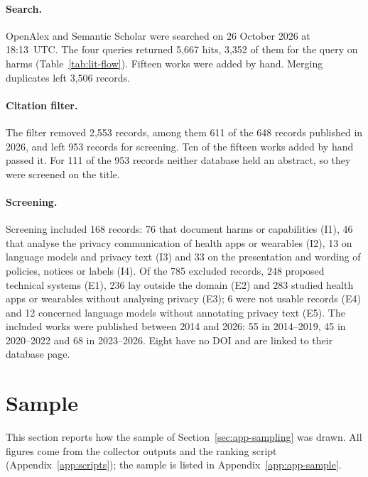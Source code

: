 \documentclass[twoside,its]{bossthesis}
\begin{document}
\paragraph{Search.} OpenAlex and Semantic Scholar were searched on 26 October
2026 at 18:13~UTC\@. The four queries returned 5{,}667 hits, 3{,}352 of them for
the query on harms (Table~\ref{tab:lit-flow}). Fifteen works were added by
hand. Merging duplicates left 3{,}506 records.

\paragraph{Citation filter.} The filter removed 2{,}553 records, among them 611
of the 648 records published in 2026, and left 953 records for screening. Ten
of the fifteen works added by hand passed it. For 111 of the 953 records
neither database held an abstract, so they were screened on the title.

\paragraph{Screening.} Screening included 168 records: 76 that document harms
or capabilities (I1), 46 that analyse the privacy communication of health apps
or wearables (I2), 13 on language models and privacy text (I3) and 33 on the
presentation and wording of policies, notices or labels (I4). Of the 785
excluded records, 248 proposed technical systems (E1), 236 lay outside the
domain (E2) and 283 studied health apps or wearables without analysing privacy
(E3); 6 were not usable records (E4) and 12 concerned language models without
annotating privacy text (E5). The included works were published between 2014
and 2026: 55 in 2014--2019, 45 in 2020--2022 and 68 in 2023--2026. Eight have no
DOI and are linked to their database page.

\section{Sample}
\label{sec:results-sample}
This section reports how the sample of Section~\ref{sec:app-sampling} was
drawn. All figures come from the collector outputs and the ranking script
(Appendix~\ref{app:scripts}); the sample is listed in
Appendix~\ref{app:app-sample}.
\end{document}
